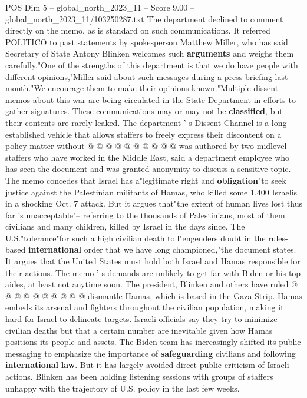 \begin{textsample}{POS Dim 5 – global\_north\_2023\_11 – Score 9.00 – global\_north\_2023\_11/103250287.txt}
The department declined to comment directly on the memo, as is standard on such communications.
It referred POLITICO to past statements by spokesperson Matthew Miller, who has said Secretary of State Antony Blinken welcomes such \textbf{arguments} and weighs them carefully."One of the strengths of this department is that we do have people with different opinions,"Miller said about such messages during a press briefing last month."We encourage them to make their opinions known."Multiple dissent memos about this war are being circulated in the State Department in efforts to gather signatures.
These communications may or may not be \textbf{classified}, but their contents are rarely leaked.
The department ' s Dissent Channel is a long-established vehicle that allows staffers to freely express their discontent on a policy matter without @ @ @ @ @ @ @ @ @ @ was authored by two midlevel staffers who have worked in the Middle East, said a department employee who has seen the document and was granted anonymity to discuss a sensitive topic.
The memo concedes that Israel has a"legitimate right and \textbf{obligation}"to seek justice against the Palestinian militants of Hamas, who killed some 1,400 Israelis in a shocking Oct. 7 attack.
But it argues that"the extent of human lives lost thus far is unacceptable"-- referring to the thousands of Palestinians, most of them civilians and many children, killed by Israel in the days since.
The U.S."tolerance"for such a high civilian death toll"engenders doubt in the rules-based \textbf{international} order that we have long championed,"the document states.
It argues that the United States must hold both Israel and Hamas responsible for their actions.
The memo ' s demands are unlikely to get far with Biden or his top aides, at least not anytime soon.
The president, Blinken and others have ruled @ @ @ @ @ @ @ @ @ @ dismantle Hamas, which is based in the Gaza Strip.
Hamas embeds its arsenal and fighters throughout the civilian population, making it hard for Israel to delineate targets.
Israeli officials say they try to minimize civilian deaths but that a certain number are inevitable given how Hamas positions its people and assets.
The Biden team has increasingly shifted its public messaging to emphasize the importance of \textbf{safeguarding} civilians and following \textbf{international} \textbf{law}.
But it has largely avoided direct public criticism of Israeli actions.
Blinken has been holding listening sessions with groups of staffers unhappy with the trajectory of U.S. policy in the last few weeks.

\end{textsample}
